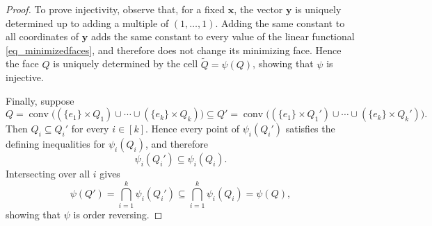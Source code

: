 \documentclass[10pt,a4paper]{amsart}
\begin{document}
\begin{proof}
To prove injectivity, observe that, for a fixed $\mathbf{x}$, the vector $\mathbf{y}$ is uniquely determined up to adding a multiple of $(1,\dots,1)$. Adding the same constant to all coordinates of $\mathbf{y}$ adds the same constant to every value of the linear functional \eqref{eq_minimizedfaces}, and therefore does not change its minimizing face. Hence the face $Q$ is uniquely determined by the cell $\tilde Q=\psi(Q)$, showing that $\psi$ is injective.

Finally, suppose
\[
Q=
\operatorname{conv}\bigl((\{e_1\}\times Q_1)\cup\cdots\cup(\{e_k\}\times Q_k)\bigr)
\subseteq
Q'=
\operatorname{conv}\bigl((\{e_1\}\times Q_1')\cup\cdots\cup(\{e_k\}\times Q_k')\bigr).
\]
Then $Q_i\subseteq Q_i'$ for every $i\in[k]$. Hence every point of $\psi_i(Q_i')$ satisfies the defining inequalities for $\psi_i(Q_i)$, and therefore
\[
\psi_i(Q_i')\subseteq\psi_i(Q_i).
\]
Intersecting over all $i$ gives
\[
\psi(Q')
=
\bigcap_{i=1}^k\psi_i(Q_i')
\subseteq
\bigcap_{i=1}^k\psi_i(Q_i)
=
\psi(Q),
\]
showing that $\psi$ is order reversing.
\end{proof}
\end{document}
